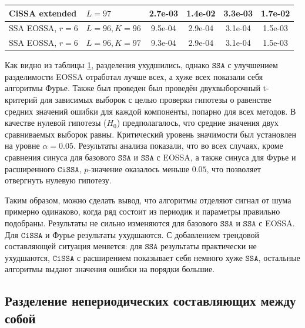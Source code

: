 \documentclass[12pt, specialist, subf
]{disser}
\theoremstyle{definition}
\newcommand{\SSA}{\texttt{SSA}}
\newcommand{\CISSA}{\texttt{CiSSA}}
\begin{document}
\begin{table}[H]
\begin{tabular}{l|l|cccc}
		CiSSA extended     & $L = 97$           &
		2.7e-03            & 1.4e-02            & 3.3e-03                               & 1.7e-02                                                                                         \\
		\hline
		SSA EOSSA, $r = 6$ & $L = 96, K = 96 $  & 9.5e-04                               & 2.9e-04                          & 3.1e-04                          & 1.5e-03                   \\
		SSA EOSSA, $r = 6$ & $L = 96, K = 97 $  &
		9.3e-04            & 2.9e-04            & 3.1e-04                               & 1.5e-03                                                                                         \\
		\hline
	\end{tabular}
	\label{tab:errs_fourier_cissa_trend_noised}
\end{table}


Как видно из таблицы \ref{tab:errs_fourier_cissa_trend_noised}, разделения ухудшились, однако $\SSA$ с улучшением разделимости EOSSA отработал лучше всех, а хуже всех показали себя алгоритмы Фурье. Также был проведен был проведён двухвыборочный t-критерий для зависимых выборок с целью проверки гипотезы о равенстве средних значений ошибки для каждой компоненты, попарно для всех методов. В качестве нулевой гипотезы ($H_0$) предполагалось, что средние значения двух сравниваемых выборок равны. Критический уровень значимости был установлен на уровне $\alpha = 0.05$.
Результаты анализа показали, что во всех случаях, кроме сравнения синуса для базового $\SSA$ и $\SSA$ с EOSSA, а также синуса для Фурье и расширенного $\CISSA$, $p$-значение оказалось меньше $0.05$, что позволяет отвергнуть нулевую гипотезу.

Таким образом, можно сделать вывод, что алгоритмы отделяют сигнал от шума примерно одинаково, когда ряд состоит из периодик и параметры правильно подобраны. Результаты не сильно изменяются для базового $\SSA$ и $\SSA$ с EOSSA. Для $\CISSA$ и Фурье результаты ухудшаются. С добавлением трендовой составляющей ситуация меняется: для $\SSA$ результаты практически не ухудшаются, $\CISSA$ с расширением показывает себя немного хуже $\SSA$, остальные алгоритмы выдают значения ошибки на порядки большие.

\subsection{Разделение непериодических составляющих между собой}
\label{subsubsec:nonperiodic}
\end{document}
